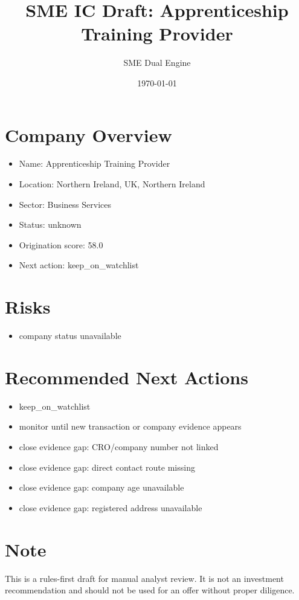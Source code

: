 \documentclass[11pt,a4paper]{article}
\title{SME IC Draft: Apprenticeship Training Provider}
\author{SME Dual Engine}
\date{\today}
\begin{document}
\maketitle
\section*{Company Overview}
\begin{itemize}[leftmargin=1.4em]
\item Name: Apprenticeship Training Provider
\item Location: Northern Ireland, UK, Northern Ireland
\item Sector: Business Services
\item Status: unknown
\item Origination score: 58.0
\item Next action: keep\_on\_watchlist
\end{itemize}
\section*{Risks}
\begin{itemize}[leftmargin=1.4em]
\item company status unavailable
\end{itemize}
\section*{Recommended Next Actions}
\begin{itemize}[leftmargin=1.4em]
\item keep\_on\_watchlist
\item monitor until new transaction or company evidence appears
\item close evidence gap: CRO/company number not linked
\item close evidence gap: direct contact route missing
\item close evidence gap: company age unavailable
\item close evidence gap: registered address unavailable
\end{itemize}
\section*{Note}
This is a rules-first draft for manual analyst review. It is not an investment
recommendation and should not be used for an offer without proper diligence.
\end{document}
